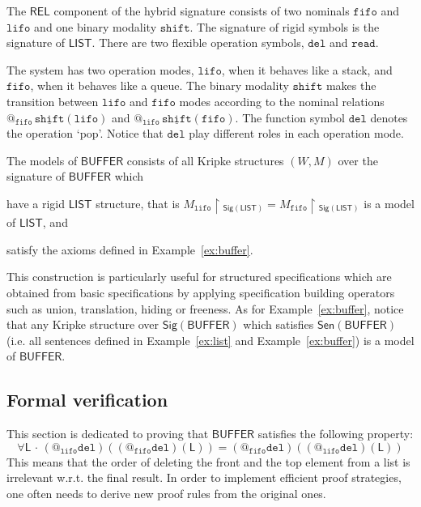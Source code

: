 \documentclass{article}
\makeatletter
\newcommand{\REL}{{\mathsf{REL}}}
\newcommand{\Sig}{\mathsf{Sig}}
\newcommand{\Sen}{\mathsf{Sen}}
\newcommand{\Lis}{\mathsf{L}}
\newcommand{\LIST}{{\mathsf{LIST}}}
\newcommand{\BUFFER}{{\mathsf{BUFFER}}}
\newcommand{\fifo}{{\mathtt{fifo}}}
\newcommand{\lifo}{{\mathtt{lifo}}}
\newcommand{\Read}{{\mathtt{read}}}
\newcommand{\del}{{\mathtt{del}}}
\newcommand{\shift}{{\mathtt{shift}}}
\newcommand{\red}{\!\upharpoonright\!\!}
\newcommand{\at}[1]{@_{#1}\,}
\newcommand{\Forall}[1]{\forall #1\,{\cdot}\,}
\newcounter{nr}
\makeatother
\begin{document}
 The $\REL$ component of the hybrid signature consists of two nominals $\fifo$ and $\lifo$ and one binary modality $\shift$. 
 The signature of rigid symbols is the signature of $\LIST$.
 There are two flexible operation symbols, $\del$ and $\Read$.
  
 The system has two operation modes, $\lifo$, when it behaves like a stack, and $\fifo$, when it behaves like a queue. 
 The binary modality $\shift$ makes the transition between $\lifo$ and $\fifo$ modes according to the nominal relations $\at{\fifo}\underline{\shift}(\lifo)$ and $\at{\lifo}\underline{\shift}(\fifo)$.
 The function symbol $\del$ denotes the operation `pop'. 
 Notice that $\del$ play different roles in each operation mode.
 
 The models of $\BUFFER$ consists of all Kripke structures $(W,M)$ over the signature of $\BUFFER$ which 
 \begin{enumerate*}[label=(\alph*)]
  \item have a rigid $\LIST$ structure, that is $M_\lifo\red_{\Sig(\LIST)}=M_\fifo\red_{\Sig(\LIST)}$ is a model of $\LIST$, and 
  
  \item satisfy the axioms defined in Example~\ref{ex:buffer}.
\end{enumerate*}
 This construction is particularly useful for structured specifications which are obtained from basic specifications by applying specification building operators such as union, translation, hiding or freeness.
 As for Example~\ref{ex:buffer}, notice that any Kripke structure over $\Sig(\BUFFER)$ which satisfies $\Sen(\BUFFER)$ (i.e. all sentences defined in Example~\ref{ex:list} and Example~\ref{ex:buffer}) is a model of $\BUFFER$.


\subsection{Formal verification}

 This section is dedicated to proving that  $\BUFFER$ satisfies the following property:
 $$ \Forall{\Lis}(@_\lifo\del)((@_\fifo\del)(\Lis))=(@_\fifo\del)((@_\lifo\del)(\Lis))$$
 This means that the order of deleting the front and the top element from a list is irrelevant w.r.t. the final result.
 In order to implement efficient proof strategies, one often needs to derive new proof rules from the original ones.
\end{document}
